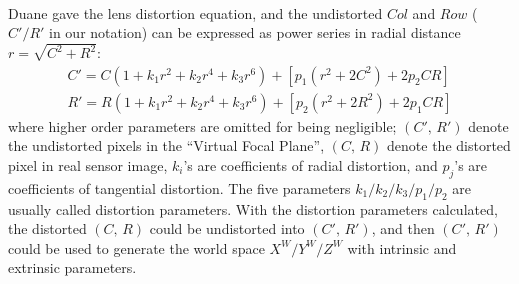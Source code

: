 \\\indent%
Duane \cite{distortion2_1966} gave the lens distortion equation, and the undistorted \(Col\) and \(Row\) (\(C'/R'\) in our notation) can be expressed as power series in radial distance \(r = \sqrt{C^2 + R^2}\):
%
\begin{equation}
\begin{aligned}
C' =  C (1 + k_1 r^2 + k_2 r^4 + k_3 r^6) + [p_1 (r^2 + 2 C^2) + 2 p_2 CR] %
\\
R' =  R (1 + k_1 r^2 + k_2 r^4 + k_3 r^6) + [p_2 (r^2 + 2 R^2) + 2 p_1 CR]
\end{aligned}
\label{lensDistortion}
\end{equation}%
%
\noindent
where higher order parameters are omitted for being negligible; \((C', \, R')\) denote the undistorted pixels in the \enquote{Virtual Focal Plane}, \((C, \, R)\) denote the distorted pixel in real sensor image, \(k_i\)'s are coefficients of radial distortion, and \(p_j\)'s are coefficients of tangential distortion. The five parameters \(k_1/k_2/k_3/p_1/p_2\) are usually called distortion parameters. With the distortion parameters calculated, the distorted \((C, \, R)\) could be undistorted into \((C', \, R')\), and then \((C', \, R')\) could be used to generate the world space \(X^W/Y^W/Z^W\) with intrinsic and extrinsic parameters.
%


